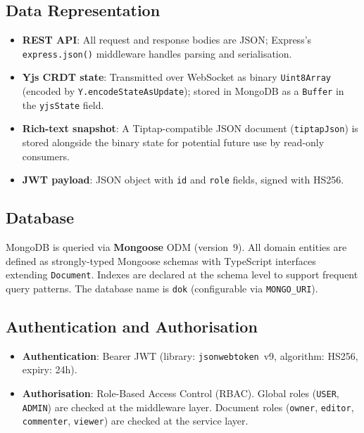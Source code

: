 \documentclass{scrartcl}
\begin{document}
  \subsection{Data Representation}

  \begin{itemize}
    \item \textbf{REST API}: All request and response bodies are JSON; Express's
    \texttt{express.json()} middleware handles parsing and serialisation.
    \item \textbf{Yjs CRDT state}: Transmitted over WebSocket as binary \texttt{Uint8Array}
    (encoded by \texttt{Y.encodeStateAsUpdate}); stored in MongoDB as a \texttt{Buffer} in
    the \texttt{yjsState} field.
    \item \textbf{Rich-text snapshot}: A Tiptap-compatible JSON document (\texttt{tiptapJson})
    is stored alongside the binary state for potential future use by read-only consumers.
    \item \textbf{JWT payload}: JSON object with \texttt{id} and \texttt{role} fields, signed
    with HS256.
  \end{itemize}

  \subsection{Database}

  MongoDB is queried via \textbf{Mongoose} ODM (version~9). All domain entities are defined
  as strongly-typed Mongoose schemas with TypeScript interfaces extending \texttt{Document}.
  Indexes are declared at the schema level to support frequent query patterns. The database
  name is \texttt{dok} (configurable via \texttt{MONGO\_URI}).

  \subsection{Authentication and Authorisation}

  \begin{itemize}
    \item \textbf{Authentication}: Bearer JWT (library: \texttt{jsonwebtoken}~v9, algorithm:
    HS256, expiry: 24h).
    \item \textbf{Authorisation}: Role-Based Access Control (RBAC). Global roles
    (\texttt{USER}, \texttt{ADMIN}) are checked at the middleware layer. Document roles
    (\texttt{owner}, \texttt{editor}, \texttt{commenter}, \texttt{viewer}) are checked at
    the service layer.
  \end{itemize}
\end{document}
